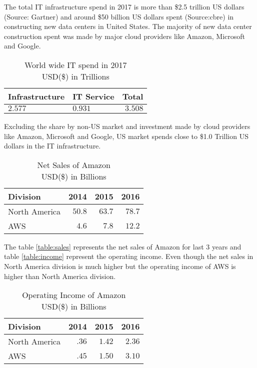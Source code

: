 \documentclass[fleqn,10pt]{SelfArx} %
\begin{document}
The total IT infrastructure spend in 2017 is more than \$2.5 trillion US dollars (Source: Gartner) and around \$50 billion US dollars spent (Source:cbre)  in constructing new data centers in United States. The majority of new data center construction spent was made by major cloud providers like Amazon, Microsoft and Google. 

\begin{table}[hbt]
\caption{World wide IT spend in 2017\\ USD(\$) in Trillions}
\centering
\begin{tabular}{llr}
\toprule
 Infrastructure & IT Service & Total \\
\midrule
$2.577$ & $0.931$ & $3.508$ \\
\bottomrule
\end{tabular}
\label{tab:label}
\end{table}

Excluding the share by non-US market and investment made by cloud providers like Amazon, Microsoft and Google, US market spends close to \$1.0 Trillion US dollars in the IT infrastructure. 


\begin{table}[hbt]
\caption{Net Sales of Amazon\\ USD(\$) in Billions}
\centering
\begin{tabular}{lrrr}
\toprule
Division & 2014 & 2015 & 2016 \\
\midrule
North America & $50.8$ & $63.7$ & $78.7$ \\
AWS & $4.6$ & $7.8$ & $12.2$ \\
\bottomrule
\end{tabular}
\label{tab:sales}
\end{table}

The table \ref{table:sales} represents the net sales of Amazon for last 3 years and table \ref{table:income} represent the operating income. Even though the net sales in North America division is much higher but the operating income of AWS is higher than North America division. 

\begin{table}[hbt]
\caption{Operating Income of Amazon\\ USD(\$) in Billions}
\centering
\begin{tabular}{lrrr}
\toprule
Division & 2014 & 2015 & 2016 \\
\midrule
North America & $.36$ & $1.42$ & $2.36$ \\
AWS & $.45$ & $1.50$ & $3.10$ \\
\bottomrule
\end{tabular}
\label{tab:income}
\end{table}
\end{document}
